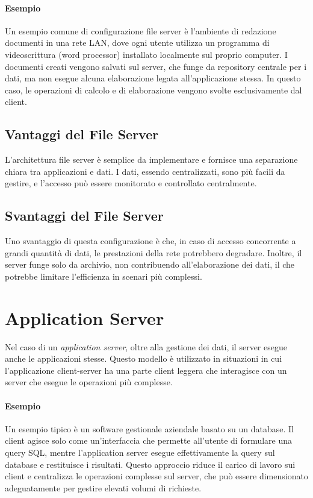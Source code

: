 \documentclass[12pt]{report}
\begin{document}
	\paragraph{Esempio}
	Un esempio comune di configurazione file server è l'ambiente di redazione documenti in una rete LAN, dove ogni utente utilizza un programma di videoscrittura (word processor) installato localmente sul proprio computer. I documenti creati vengono salvati sul server, che funge da repository centrale per i dati, ma non esegue alcuna elaborazione legata all'applicazione stessa. In questo caso, le operazioni di calcolo e di elaborazione vengono svolte esclusivamente dal client.

	\subsection{Vantaggi del File Server}
	L'architettura file server è semplice da implementare e fornisce una separazione chiara tra applicazioni e dati. I dati, essendo centralizzati, sono più facili da gestire, e l'accesso può essere monitorato e controllato centralmente.

	\subsection{Svantaggi del File Server}
	Uno svantaggio di questa configurazione è che, in caso di accesso concorrente a grandi quantità di dati, le prestazioni della rete potrebbero degradare. Inoltre, il server funge solo da archivio, non contribuendo all'elaborazione dei dati, il che potrebbe limitare l'efficienza in scenari più complessi.

	\section{Application Server}
	Nel caso di un \textit{application server}, oltre alla gestione dei dati, il server esegue anche le applicazioni stesse. Questo modello è utilizzato in situazioni in cui l'applicazione client-server ha una parte client leggera che interagisce con un server che esegue le operazioni più complesse.

	\paragraph{Esempio}
	Un esempio tipico è un software gestionale aziendale basato su un database. Il client agisce solo come un'interfaccia che permette all'utente di formulare una query SQL, mentre l'application server esegue effettivamente la query sul database e restituisce i risultati. Questo approccio riduce il carico di lavoro sui client e centralizza le operazioni complesse sul server, che può essere dimensionato adeguatamente per gestire elevati volumi di richieste.
\end{document}
